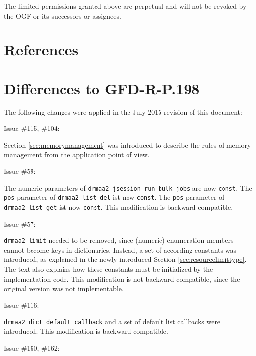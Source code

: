 \documentclass{article}
\newcommand{\h}[1]{\texttt{#1}}
\newcommand{\rat}[1]{}
\begin{document}
 The limited permissions granted above are perpetual and will not be
 revoked by the OGF or its successors or assignees.


\section{References}
\renewcommand{\refname}{}
\vspace*{-3em}


\newpage
\appendix

\section{Differences to GFD-R-P.198}
\label{sec:errata}

The following changes were applied in the July 2015 revision of this document:

Issue \#115, \#104:

Section \ref{sec:memorymanagement} was introduced to describe the rules of memory management from the application point of view.

Issue \#59:

The numeric parameters of \lstinline{drmaa2_jsession_run_bulk_jobs} are now \lstinline{const}. The \lstinline{pos} parameter of \lstinline{drmaa2_list_del} ist now \lstinline{const}. The \lstinline{pos} parameter of \lstinline{drmaa2_list_get} ist now \lstinline{const}. This modification is backward-compatible.

Issue \#57:

\lstinline{drmaa2_limit} needed to be removed, since (numeric) enumeration members cannot become keys in dictionaries. Instead, a set of according constants was introduced, as explained in the newly introduced Section \ref{sec:resourcelimittype}. The text also explains how these constants must be initialized by the implementation code. This modification is not backward-compatible, since the original version was not implementable.

\rat{The issue text further discusses why the extern const approach was favoured over a simple macro definition. The main reason is convinience for C++ people.}

Issue \#116:

\h{drmaa2\_dict\_default\_callback} and a set of default list callbacks were introduced. This modification is backward-compatible.

Issue \#160, \#162:
\end{document}
